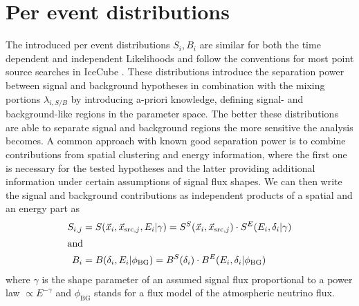 \section{Per event distributions}
The introduced per event distributions $S_i, B_i$ are similar for both the time dependent and independent Likelihoods and follow the conventions for most point source searches in IceCube .
These distributions introduce the separation power between signal and background hypotheses in combination with the mixing portions $\lambda_{i,S/B}$ by introducing a-priori knowledge, defining signal- and background-like regions in the parameter space.
The better these distributions are able to separate signal and background regions the more sensitive the analysis becomes.
A common approach with known good separation power is to combine contributions from spatial clustering and energy information, where the first one is necessary for the tested hypotheses and the latter providing additional information under certain assumptions of signal flux shapes.
We can then write the signal and background contributions as independent products of a spatial and an energy part as
\begin{align}
  S_{i,j} &= S(\vec{x}_i, \vec{x}_{\mathrm{src},j}, E_i | \gamma)
    = S^S(\vec{x}_i, \vec{x}_{\mathrm{src},j})\cdot
      S^E(E_i, \delta_i | \gamma) \\
  \intertext{and}
  B_i &= B(\delta_i, E_i | \phi_\mathrm{BG})
    = B^S(\delta_i) \cdot B^E(E_i, \delta_i | \phi_\mathrm{BG})
\end{align}
where $\gamma$ is the shape parameter of an assumed signal flux proportional to a power law $\propto E^{-\gamma}$ and $\phi_\mathrm{BG}$ stands for a flux model of the atmospheric neutrino flux.

